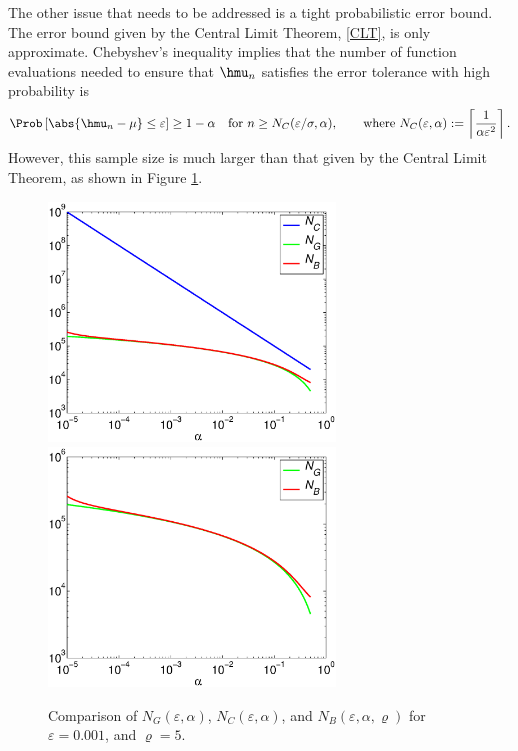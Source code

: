 \documentclass[12pt]{amsart}
\begin{document}
The other issue that needs to be addressed is a tight probabilistic error bound.  The error bound given by the Central Limit Theorem, \eqref{CLT}, is only approximate.   Chebyshev's inequality implies that the number of function evaluations needed to ensure that $\hmu_n$ satisfies the error tolerance with high probability is
\begin{equation} \label{NCdef}
\Prob\left[\abs{\hmu_n-\mu} \le \varepsilon \right] \ge 1-\alpha \quad \text{for } n \ge N_{C}(\varepsilon/\sigma,\alpha), \qquad \text{where }
N_{C}(\varepsilon,\alpha) :=\left \lceil \frac{1}{\alpha\varepsilon^2} \right \rceil.
\end{equation}
However, this sample size is much larger than that given by the Central Limit Theorem, as shown in Figure \ref{alphacomparefig}.

\begin{figure}
\centering
\includegraphics[width=3in]{alphacompare.eps} \quad \includegraphics[width=3in]{alphacompareb.eps} \quad 
\caption{Comparison of $ N_G(\varepsilon,\alpha)$, $N_C(\varepsilon,\alpha)$, and $N_B(\varepsilon,\alpha,\varrho)$ for $\varepsilon = 0.001$, and $\varrho=5$. \label{alphacomparefig}}
\end{figure}
\end{document}
